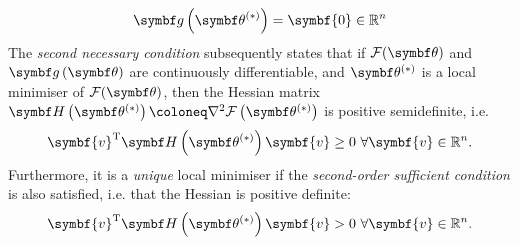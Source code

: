 \begin{equation}
    \bdgthstar = \symbf{0} \in \mathbb{R}^n
\end{equation}
The \emph{second necessary condition} subsequently states that
if $\Fth$ and $\bdgth$ are continuously differentiable, and $\bthstar$ is a
local minimiser of $\Fth$, then the Hessian matrix $\bdHthstar \coloneq
\nabla^2 \Fthstar$ is positive semidefinite, i.e.
\begin{equation}
  \symbf{v}^{\mathrm{T}} \bdHthstar \symbf{v} \geq 0\ \forall \symbf{v} \in \mathbb{R}^n.
\end{equation}
Furthermore, it is a \emph{unique} local minimiser if the \emph{second-order
sufficient condition} is also satisfied, i.e. that the Hessian is positive
definite:
\begin{equation}
    \symbf{v}^{\mathrm{T}} \bdHthstar \symbf{v} > 0\ \forall \symbf{v} \in \mathbb{R}^n.
\end{equation}

